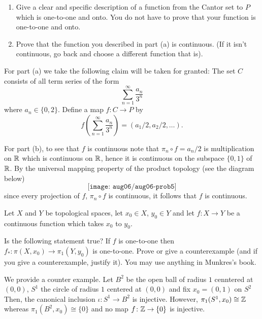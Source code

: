 \begin{problem}
  \hfill
  \begin{enumerate}[label=(\alph*),noitemsep]
  \item Give a clear and specific description of a function from the Cantor
    set to $P$ which is one-to-one and onto. You do not have to prove that
    your function is one-to-one and onto.
  \item Prove that the function you described in part (a) is
    continuous. (If it isn't continuous, go back and choose a different
    function that is).
  \end{enumerate}
\end{problem}
\begin{solution}
  For part (a) we take the following claim will be taken for granted: The
  set $C$ consists of all term series of the form
  \[
    \sum_{n=1}^\infty\frac{a_n}{3^n}
  \]
  where $a_n\in\{0,2\}$. Define a map $f\colon C\to P$ by
  \[
    f\left(\sum_{n=1}^\infty\frac{a_n}{3^n}\right)=(a_1/2,a_2/2,\ldots).
  \]

  For part (b), to see that $f$ is continuous note that
  $\pi_n\circ f=a_n/2$ is multiplication on $\mathbb{R}$ which is continuous on
  $\mathbb{R}$, hence it is continuous on the subspace $\{0,1\}$ of $\mathbb{R}$. By
  the universal mapping property of the product topology (see the diagram
  below)
  \[
    \texttt{[image: aug06/aug06-prob5]}
  \]
  since every projection of $f$, $\pi_n\circ f$ is continuous, it follows
  that $f$ is continuous.
\end{solution}

\begin{problem}
  Let $X$ and $Y$ be topological spaces, let $x_0\in X$, $y_0\in Y$ and let
  $f\colon X\to Y$ be a continuous function which takes $x_0$ to $y_0$.

  Is the following statement true? If $f$ is one-to-one then
  $f_*\colon\pi(X,x_0)\to \pi_1(Y,y_0)$ is one-to-one. Prove or give a
  counterexample (and if you give a counterexample, justify it). You may
  use anything in Munkres's book.
\end{problem}
\begin{solution}
  We provide a counter example. Let $B^2$ be the open ball of radius $1$
  cenntered at $(0,0)$, $S^1$ the circle of radius $1$ centered at $(0,0)$
  and fix $x_0=(0,1)$ on $S^2$ Then, the canonical inclusion
  $\iota\colon S^1\to B^2$ is injective. However, $\pi_1(S^1,x_0)\cong\mathbb{Z}$
  whereas $\pi_1(B^2,x_0)\cong \{0\}$ and no map $f\colon\mathbb{Z}\to\{0\}$ is
  injective.
\end{solution}


